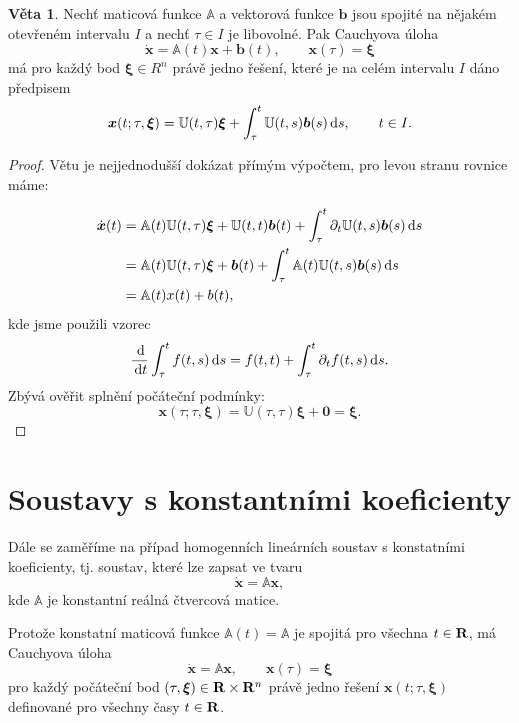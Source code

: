 \documentclass[a4paper, 12pt]{book}
\theoremstyle{definition}
\newtheorem{theorem}{Věta}[section]
\def\Real{{\rm\bf R}}
\def\d{\,{\rm d}}               %
\def\vc#1{\mathbf{\boldsymbol{#1}}}     %
\def\tn#1{{\mathbb{#1}}}    %
\def\prtl{\partial}                                        %
\begin{document}
\begin{theorem}
Nechť maticová funkce ${\tn A}$ a vektorová funkce $\vc b$ jsou spojité na 
nějakém otevřeném intervalu $I$ a nechť $\tau \in I$ je libovolné. Pak Cauchyova
úloha
\[
    \dot{\vc x} = {\tn A}(t)\vc x+\vc b(t),\qquad \vc x(\tau)=\vc\xi
\]
má pro každý bod $\vc\xi\in R^n$ právě jedno řešení, které je na celém intervalu 
$I$ dáno předpisem
\[
    \vc x(t;\tau,\vc\xi) = {\tn U}(t,\tau)\vc\xi+\int_\tau^t{\tn U}(t,s) \vc b(s)\d s,\qquad t\in I.
\]
\end{theorem}
\begin{proof}
Větu je nejjednodušší dokázat přímým výpočtem, pro levou stranu rovnice máme:

\begin{align*}
   \dot{\vc x}(t) &= \tn A(t) \tn U(t,\tau) \vc \xi +\tn U(t,t) \vc b(t) + \int_\tau^t \prtl_t{\tn U}(t,s) \vc b(s) \d s\\
                  &= \tn A(t) \tn U(t,\tau) \vc \xi + \vc b(t) + \int_\tau^t \tn A(t)\tn U(t,s) \vc b(s) \d s\\
                  &= \tn A(t) x(t) + b(t),
\end{align*}
kde jsme použili vzorec
\[ 
   \frac{\d}{\d t} \int_\tau^t f(t,s) \d s = f(t,t) + \int_\tau^t \prtl_t f(t,s) \d s.
\]
Zbývá ověřit splnění počáteční podmínky:
\[
   \vc x(\tau;\tau, \vc \xi) = {\tn U}(\tau, \tau) \vc \xi + \vc 0 = \vc \xi.
\]
\end{proof}



\section{Soustavy s konstantními koeficienty}
\label{konst_koef}


Dále se zaměříme na případ homogenních lineárních soustav s konstatními 
koeficienty, tj. soustav, které lze zapsat ve tvaru
\begin{equation}
    \label{eq:const_coef}
    \dot{\vc x} = {\tn A}\vc x,
\end{equation}
kde $\tn A$ je konstantní reálná čtvercová matice.

Protože konstatní maticová funkce $\tn A(t)=\tn A$ je spojitá pro všechna $t\in \Real$, má Cauchyova úloha
\begin{equation}
    \label{eq:cauchy_const_coef}
    \dot{\vc x} = {\tn A}\vc x,\qquad \vc x(\tau)=\vc\xi
\end{equation}
pro každý počáteční bod $(\tau,\vc\xi)\in \Real\times \Real^n$ právě jedno řešení 
$\vc x(t;\tau,\vc\xi)$ definované pro všechny časy $t\in \Real$. 
\end{document}
